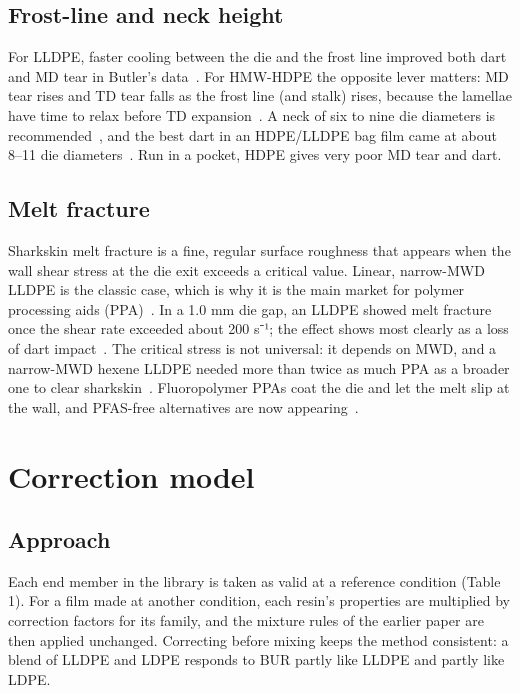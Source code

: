 \documentclass[conference,a4paper]{IEEEtran}
\begin{document}
\subsection{Frost-line and neck height}

For LLDPE, faster cooling between the die and the frost line improved both dart and MD tear in Butler's data~\cite{r4}. For HMW-HDPE the opposite lever matters: MD tear rises and TD tear falls as the frost line (and stalk) rises, because the lamellae have time to relax before TD expansion~\cite{r7}. A neck of six to nine die diameters is recommended~\cite{r8}, and the best dart in an HDPE/LLDPE bag film came at about 8–11 die diameters~\cite{r9}. Run in a pocket, HDPE gives very poor MD tear and dart.

\subsection{Melt fracture}

Sharkskin melt fracture is a fine, regular surface roughness that appears when the wall shear stress at the die exit exceeds a critical value. Linear, narrow-MWD LLDPE is the classic case, which is why it is the main market for polymer processing aids (PPA)~\cite{r15}. In a 1.0 mm die gap, an LLDPE showed melt fracture once the shear rate exceeded about 200 s⁻¹; the effect shows most clearly as a loss of dart impact~\cite{r10}. The critical stress is not universal: it depends on MWD, and a narrow-MWD hexene LLDPE needed more than twice as much PPA as a broader one to clear sharkskin~\cite{r10}. Fluoropolymer PPAs coat the die and let the melt slip at the wall, and PFAS-free alternatives are now appearing~\cite{r15}.

\section{Correction model}

\subsection{Approach}

Each end member in the library is taken as valid at a reference condition (Table 1). For a film made at another condition, each resin's properties are multiplied by correction factors for its family, and the mixture rules of the earlier paper are then applied unchanged. Correcting before mixing keeps the method consistent: a blend of LLDPE and LDPE responds to BUR partly like LLDPE and partly like LDPE.
\end{document}
